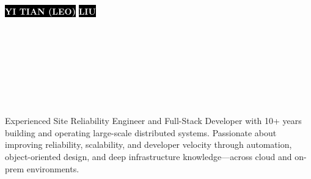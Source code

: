 \documentclass[9pt]{developercv}
\begin{document}

\begin{minipage}[t]{0.45\textwidth}
  \vspace{-\baselineskip}
  \colorbox{black}{{\HUGE\textcolor{white}{\textbf{\MakeUppercase{Yi Tian (Leo)}}}}} 
  \colorbox{black}{{\HUGE\textcolor{white}{\textbf{\MakeUppercase{Liu}}}}} 
  \vspace{6pt}
\end{minipage}
\begin{minipage}[t]{0.275\textwidth}
  \vspace{-\baselineskip}
  \\
  \\
  \\  
\end{minipage}
\begin{minipage}[t]{0.275\textwidth}
  \vspace{-\baselineskip}
  \\
  \\
  \\
\end{minipage}

\vspace{0.5cm}



\begin{minipage}[t]{0.45\textwidth}
  \vspace{-\baselineskip}
  Experienced Site Reliability Engineer and Full-Stack Developer with 10+ years building and operating large-scale distributed systems. Passionate about improving reliability, scalability, and developer velocity through automation, object-oriented design, and deep infrastructure knowledge—across cloud and on-prem environments.
\end{minipage}
\hfill
\begin{minipage}[t]{0.5\textwidth}
  \vspace{-\baselineskip}
  \begin{barchart}{5.5}
  \end{barchart}
\end{minipage}
\end{document}
